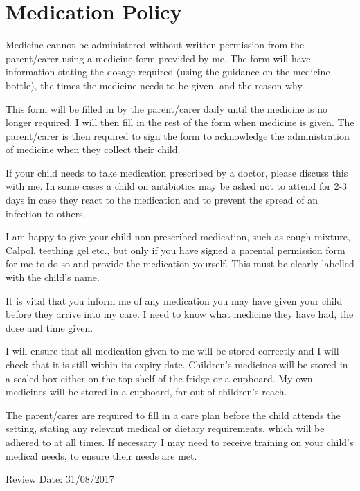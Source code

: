 

\section{Medication Policy}

Medicine cannot be administered without written permission from the
parent/carer using a medicine form provided by me. The form will have
information stating the dosage required (using the guidance on the
medicine bottle), the times the medicine needs to be given, and the
reason why.

This form will be filled in by the parent/carer daily until the medicine
is no longer required. I will then fill in the rest of the form when
medicine is given. The parent/carer is then required to sign the form to
acknowledge the administration of medicine when they collect their
child.

If your child needs to take medication prescribed by a doctor, please
discuss this with me. In some cases a child on antibiotics may be asked
not to attend for 2-3 days in case they react to the medication and to
prevent the spread of an infection to others.

I am happy to give your child non-prescribed medication, such as cough
mixture, Calpol, teething gel etc., but only if you have signed a
parental permission form for me to do so and provide the medication
yourself. This must be clearly labelled with the child's name.

It is vital that you inform me of any medication you may have given your
child before they arrive into my care. I need to know what medicine they
have had, the dose and time given.

I will ensure that all medication given to me will be stored correctly
and I will check that it is still within its expiry date. Children's
medicines will be stored in a sealed box either on the top shelf of the
fridge or a cupboard. My own medicines will be stored in a cupboard, far
out of children's reach.

The parent/carer are required to fill in a care plan before the child
attends the setting, stating any relevant medical or dietary
requirements, which will be adhered to at all times. If necessary I may
need to receive training on your child's medical needs, to ensure their
needs are met.

Review Date: 31/08/2017


